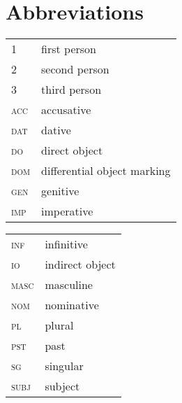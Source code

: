 \documentclass[output=paper]{LSP/langsci}
\begin{document}
\section*{Abbreviations}
\begin{tabularx}{.45\textwidth}{lQ}
\textsc{1} & first person\\
\textsc{2} & second person\\
\textsc{3} & third person\\
\textsc{acc} & accusative\\
\textsc{dat} & dative\\
\textsc{do} & direct object\\
\textsc{dom} & differential object marking \\
\textsc{gen} & genitive\\ 
\textsc{imp} & imperative\\
\end{tabularx}
\begin{tabularx}{.45\textwidth}{lQ}
\textsc{inf} & infinitive\\
\textsc{io} & indirect object\\
\textsc{masc} & masculine\\
\textsc{nom} & nominative\\
\textsc{pl} & plural\\
\textsc{pst} & past\\
\textsc{sg} & singular\\
\textsc{subj} & subject\\
\end{tabularx}

{\sloppy
\printbibliography[heading=subbibliography,notkeyword=this] }
\end{document}
